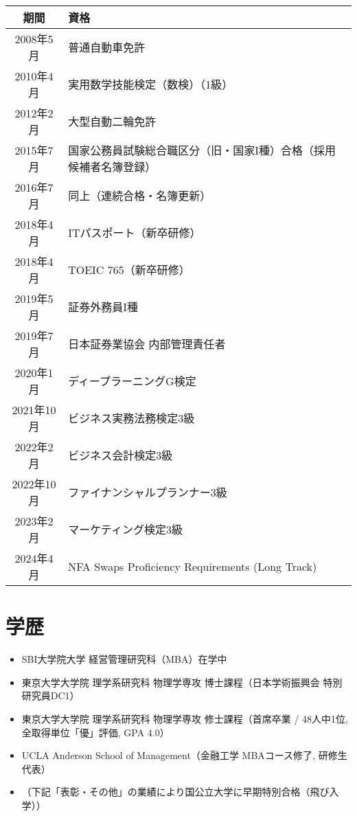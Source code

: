 \documentclass[uplatex,a4j,10.5pt,dvipdfmx]{jsarticle}
\begin{document}
\begin{longtable}{|c|l|}
	\hline
	\centering\textbf{期間} & \textbf{資格}                                     \\
	\hline
	\endhead

	\hline
	2008年5月               & 普通自動車免許                                         \\
	\hline
	2010年4月               & 実用数学技能検定（数検）（1級）                                \\
	\hline
	2012年2月               & 大型自動二輪免許                                        \\
	\hline
	2015年7月               & 国家公務員試験総合職区分（旧・国家I種）合格（採用候補者名簿登録）               \\
	\hline
	2016年7月               & 同上（連続合格・名簿更新）                                   \\
	\hline
	2018年4月               & ITパスポート（新卒研修）                                   \\
	\hline
	2018年4月               & TOEIC 765（新卒研修）                                 \\
	\hline
	2019年5月               & 証券外務員I種                                         \\
	\hline
	2019年7月               & 日本証券業協会 内部管理責任者                                 \\
	\hline
	2020年1月               & ディープラーニングG検定                                    \\
	\hline
	2021年10月              & ビジネス実務法務検定3級                                    \\
	\hline
	2022年2月               & ビジネス会計検定3級                                      \\
	\hline
	2022年10月              & ファイナンシャルプランナー3級                                 \\
	\hline
	2023年2月               & マーケティング検定3級                                     \\
	\hline
	2024年4月               & NFA Swaps Proficiency Requirements (Long Track) \\
	\hline
\end{longtable}

\section{学歴}
\begin{itemize}
	\item SBI大学院大学 経営管理研究科（MBA）在学中
	\item 東京大学大学院 理学系研究科 物理学専攻 博士課程（日本学術振興会 特別研究員DC1）
	\item 東京大学大学院 理学系研究科 物理学専攻 修士課程（首席卒業 / 48人中1位, 全取得単位「優」評価, GPA 4.0）
	\item UCLA Anderson School of Management（金融工学 MBAコース修了, 研修生代表）
	\item （下記「表彰・その他」の業績により国公立大学に早期特別合格（飛び入学））
\end{itemize}
\end{document}
